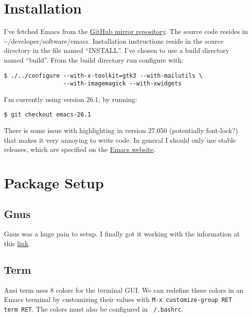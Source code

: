 \documentclass{default}
\begin{document}
\tableofcontents
\hypersetup{linkcolor=red}

\chapter{Installation}\label{cha:installation}

I've fetched Emacs from the \href{https://github.com/emacs-mirror/emacs}{GitHub mirror
  repository}. The source code resides in \textasciitilde/developer/software/emacs. Installation
instructions reside in the source directory in the file named ``INSTALL''. I've chosen to use a
build directory named ``build''. From the build directory run configure with:

\begin{verbatim}
$ ./../configure --with-x-toolkit=gtk3 --with-mailutils \
                 --with-imagemagick --with-xwidgets
\end{verbatim}

I'm currently using version 26.1, by running:

\begin{verbatim}
$ git checkout emacs-26.1
\end{verbatim}

There is some issue with highlighting in version 27.050 (potentially font-lock?) that makes it very
annoying to write code. In general I should only use stable releases, which are specified on the
\href{https://www.gnu.org/software/emacs/}{Emacs website}.

\chapter{Package Setup}\label{cha:package-setup}

\section{Gnus}
\label{sec:gnus}

Gnus was a huge pain to setup. I finally got it working with the information at this
\href{https://eschulte.github.io/emacs-starter-kit/starter-kit-gnus-imap.html}{link}.

\section{Term}\label{sec:term}

Ansi term uses 8 colors for the terminal GUI. We can redefine these colors in an Emacs terminal by
customizing their values with \texttt{M-x customize-group RET term RET}. The colors must
also be configured in \texttt{~/.bashrc}.
\end{document}
